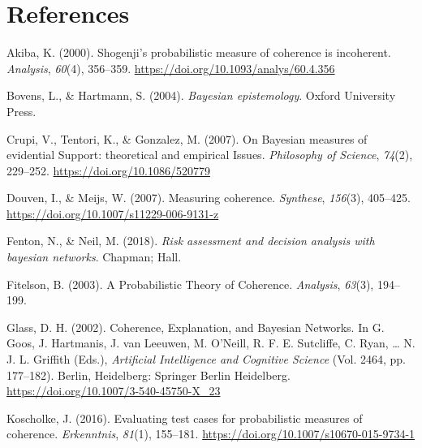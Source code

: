 \documentclass[
  10pt,
]{scrartcl}
\newlength{\cslhangindent}
\newlength{\cslentryspacingunit} %
\newenvironment{CSLReferences}[2] %
 {%
  \setlength{\parindent}{0pt}
  \ifodd #1
  \let\oldpar\par
  \def\par{\hangindent=\cslhangindent\oldpar}
  \fi
  \setlength{\parskip}{#2\cslentryspacingunit}
 }%
 {}
\begin{document}
\hypertarget{references}{%
\section*{References}\label{references}}

\hypertarget{refs}{}
\begin{CSLReferences}{1}{0}
\leavevmode{}%
Akiba, K. (2000). Shogenji's probabilistic measure of coherence is incoherent. \emph{Analysis}, \emph{60}(4), 356--359. \url{https://doi.org/10.1093/analys/60.4.356}

\leavevmode{}%
Bovens, L., \& Hartmann, S. (2004). \emph{Bayesian epistemology}. Oxford University Press.

\leavevmode{}%
Crupi, V., Tentori, K., \& Gonzalez, M. (2007). On {Bayesian measures} of {evidential Support}: {theoretical} and {empirical Issues}. \emph{Philosophy of Science}, \emph{74}(2), 229--252. \url{https://doi.org/10.1086/520779}

\leavevmode{}%
Douven, I., \& Meijs, W. (2007). Measuring coherence. \emph{Synthese}, \emph{156}(3), 405--425. \url{https://doi.org/10.1007/s11229-006-9131-z}

\leavevmode{}%
Fenton, N., \& Neil, M. (2018). \emph{Risk assessment and decision analysis with bayesian networks}. Chapman; Hall.

\leavevmode{}%
Fitelson, B. (2003). A {Probabilistic Theory} of {Coherence}. \emph{Analysis}, \emph{63}(3), 194--199.

\leavevmode{}%
Glass, D. H. (2002). Coherence, {Explanation}, and {Bayesian Networks}. In G. Goos, J. Hartmanis, J. van Leeuwen, M. O'Neill, R. F. E. Sutcliffe, C. Ryan, \ldots{} N. J. L. Griffith (Eds.), \emph{Artificial {Intelligence} and {Cognitive Science}} (Vol. 2464, pp. 177--182). {Berlin, Heidelberg}: {Springer Berlin Heidelberg}. \url{https://doi.org/10.1007/3-540-45750-X_23}

\leavevmode{}%
Koscholke, J. (2016). Evaluating test cases for probabilistic measures of coherence. \emph{Erkenntnis}, \emph{81}(1), 155--181. \url{https://doi.org/10.1007/s10670-015-9734-1}


\end{CSLReferences}
\end{document}
